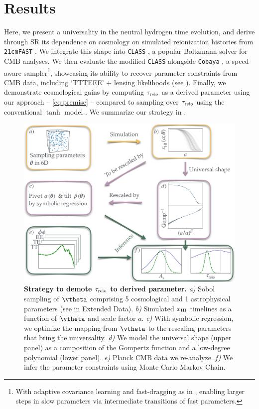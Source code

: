 \section*{Results}

Here, we present a universality in the neutral hydrogen time evolution,
and derive through SR its dependence on cosmology on simulated
reionization histories from \texttt{21cmFAST} \cite{Murray2020}.
We integrate this shape into \texttt{CLASS} \cite{Blas2011}, a popular
Boltzmann solver for CMB analyses.
We then evaluate the modified \texttt{CLASS} alongside \texttt{Cobaya}
\cite{Torrado2020}, a speed-aware sampler\cite{Lewis2002,
Lewis2013}\footnote{With adaptive covariance learning and fast-dragging
as in \cite{Neal2005}, enabling larger steps in slow parameters via
intermediate transitions of fast parameters.}, showcasing its ability to
recover parameter constraints from CMB data, including `TTTEEE' +
lensing likelihoods \cite{Planck2020c, Planck2020d} (see ).
Finally, we demonstrate cosmological gains by computing $\tau_{\mathrm{reio}}$ as
a derived parameter using our approach -- \cref{eq:premise} --
compared to sampling over $\tau_{\mathrm{reio}}$ using the conventional $\tanh$
model \cite{Lewis2008}.
We summarize our strategy in .

\begin{figure}[tb]
\centering
\includegraphics[width=\linewidth]{figs/big_fig.pdf}
\caption{\textbf{Strategy to demote $\tau_{\mathrm{reio}}$ to derived parameter.}
\emph{a)} Sobol sampling of $\vtheta$ comprising 5 cosmological and 1
astrophysical parameters (see  in Extended Data).
\emph{b)} Simulated $x_{\mathrm{HI}}$ timelines as a function of $\vtheta$ and
scale factor $a$.
\emph{c)} With symbolic regression, we optimize the mapping from
$\vtheta$ to the rescaling parameters that bring the universality.
\emph{d)} We model the universal shape (upper panel) as a composition of
the Gompertz function and a low-degree polynomial (lower panel).
\emph{e)} Planck CMB data we re-analyze.
\emph{f)} We infer the parameter constraints using Monte Carlo Markov
Chain.}
\label{fig:big}
\end{figure}

